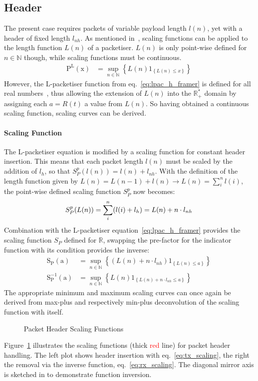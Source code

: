 \subsection{Header}
The present case requires packets of variable payload length $l(n)$, yet with a header of fixed length $l_{nh}$.
As mentioned in~\cite[p. 290 (4)]{fidler_way_2006}, scaling functions can be applied to the length function $L(n)$ of a packetiser.
$L(n)$ is only point-wise defined for $n \in \mathbb{N}$ though, while scaling functions must be continuous.
%
\begin{align}
\mathrm{P^L(x)} &= \sup_{n \in \mathbb{N}}\left\{ L(n) 1_{\left\{L(n)\le x\right\}}\right\}
\label{eq:lpac_h_framer}
\end{align}
%
However, the L-packetiser function from eq.~\ref{eq:lpac_h_framer} is defined for all real numbers~\cite[p. 42]{thiran_network_2001},
thus allowing the extension of $L(n)$ into the $\mathbb{R^*_+}$ domain by assigning each $a = R(t)$ a value from $L(n)$.
So having obtained a continuous scaling function, scaling curves can be derived.
\paragraph{Scaling Function}
The L-packetiser equation is modified by a scaling function for constant header insertion.
This means that each packet length $l(n)$ must be scaled by the addition of $l_h$, so that  $S_P^p(l(n)) = l(n) + l_{nh}$.
With the definition of the length function given by $L(n) = L(n-1) + l(n) \to L(n) = \sum_{i}^n l(i)$,
the point-wise defined scaling function $S_P^p$ now becomes:
%
\begin{align}
S_P^p(L(n)) = \sum_{i}^n (l(i) + l_h) = L(n) + n \cdot l_{nh}\notag
\end{align}
%
Combination with the L-packetiser equation~\ref{eq:lpac_h_framer} provides the scaling function $S_P$ defined for $\mathbb{R}$,
swapping the pre-factor for the indicator function with its condition provides the inverse:
%
\begin{align}
\mathrm{S_P(a)}      &= \sup_{n \in \mathbb{N}} \left \{ (L(n) + n \cdot l_{nh} )1_{ \left \{ L(n)               \le a \right \} }\right \}\label{eq:tx_scaling}\\
\mathrm{S^{-1}_P(a)} &= \sup_{n \in \mathbb{N}} \left \{ L(n)               1_{ \left \{ L(n) + n \cdot l_{nh}  \le a \right \} }\right\}\label{eq:rx_scaling}
\end{align}
%
The appropriate minimum and maximum scaling curves can once again be derived from max-plus and respectively min-plus deconvolution of the scaling function with itself.
%
\begin{figure}[H]
  \centering
  \def\svgwidth{0.95\textwidth}
  
  \caption{Packet Header Scaling Functions}
  \label{fig:hdr_scaler}
\end{figure}
\noindent
Figure~\ref{fig:hdr_scaler} illustrates the scaling functions (thick \textcolor{Red}{red} line) for packet header handling. The left plot shows header insertion with eq.~\ref{eq:tx_scaling},
the right the removal via the inverse function, eq.~\ref{eq:rx_scaling}. The diagonal mirror axis is sketched in to demonstrate function inversion.

